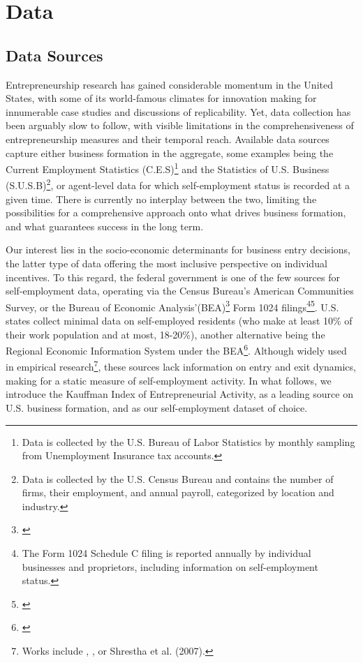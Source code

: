 \chapter{Data\label{ch:data}}

\section{Data Sources}

Entrepreneurship research has gained considerable momentum in the United States, with some of its world-famous climates for innovation making for innumerable case studies and discussions of replicability. Yet, data collection has been arguably slow to follow, with visible limitations in the comprehensiveness of entrepreneurship measures and their temporal reach. Available data sources capture either business formation in the aggregate, some examples being the Current Employment Statistics (C.E.S)\footnote{Data is collected by the U.S. Bureau of Labor Statistics by monthly sampling from Unemployment Insurance tax accounts.} and the Statistics of U.S. Business (S.U.S.B)\footnote{Data is collected by the U.S. Census Bureau and contains the number of firms, their employment, and annual payroll, categorized by location and industry.}, or agent-level data for which self-employment status is recorded at a given time. There is currently no interplay between the two, limiting the possibilities for a comprehensive approach onto what drives business formation, and what guarantees success in the long term. 

Our interest lies in the socio-economic determinants for business entry decisions, the latter type of data offering the most inclusive perspective on individual incentives. To this regard, the federal government is one of the few sources for self-employment data, operating via the Census Bureau’s American Communities Survey, or the Bureau of Economic Analysis'(BEA)\footnote{\cite{BEA}} Form 1024 filings\footnote{The Form 1024 Schedule C filing is reported annually by individual businesses and proprietors, including information on self-employment status. }\footnote{\cite{Goetz2008}}. U.S. states collect minimal data on self-employed residents (who make at least 10\% of their work population and at most, 18-20\%), another alternative being the Regional Economic Information System under the BEA\footnote{\cite{Goetz2008}}. Although widely used in empirical research\footnote{Works include \cite{Glaeser2007}, \cite{AcsArmington2006}, or Shrestha et al. (2007). }, these sources lack information on entry and exit dynamics, making for a  static measure of self-employment activity. In what follows, we introduce the Kauffman Index of Entrepreneurial Activity, as a leading source on U.S. business formation, and as our self-employment dataset of choice. 

